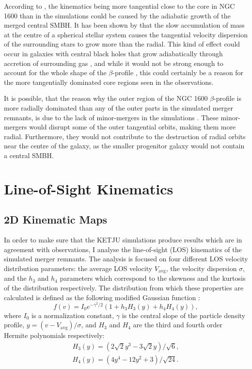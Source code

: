 \documentclass[english, oneside]{HYgradu}
\begin{document}
According to \cite{Rantala2018}, the kinematics being more tangential close to the core in NGC 1600 than in the simulations could be caused by the adiabatic growth of the merged central SMBH. It has been shown by \cite{GoodmanBinney1984} that the slow accumulation of mass at the centre of a spherical stellar system causes the tangential velocity dispersion of the surrounding stars to grow more than the radial. This kind of effect could occur in galaxies with central black holes that grow adiabatically through accretion of surrounding gas \citep{Young1980}, and while it would not be strong enough to account for the whole shape of the $\beta$-profile \citep{Thomas2014}, this could certainly be a reason for the more tangentially dominated core regions seen in the observations.

It is possible, that the reason why the outer region of the NGC 1600 $\beta$-profile is more radially dominated than any of the outer parts in the simulated merger remnants, is due to the lack of minor-mergers in the simulations \citep{Rantala2018}. These minor-mergers would disrupt some of the outer tangential orbits, making them more radial. Furthermore, they would not contribute to the destruction of radial orbits near the centre of the galaxy, as the smaller progenitor galaxy would not contain a central SMBH.

\section{Line-of-Sight Kinematics}

\subsection{2D Kinematic Maps}

In order to make sure that the KETJU simulations produce results which are in agreement with observations, I analyse the line-of-sight (LOS) kinematics of the simulated merger remnants. The analysis is focused on four different LOS velocity distribution parameters: the average LOS velocity $V_\mathrm{avg}$, the velocity dispersion $\sigma$, and the $h_3$ and $h_4$ parameters which correspond to the skewness and the kurtosis of the distribution respectively. The distribution from which these properties are calculated is defined as the following modified Gaussian function \citep{VanDerMarel1993, Bender1994}:
\begin{equation}
f(v) = I_0 e^{-\gamma^2/2}(1 + h_3 H_3(y) + h_4 H_4(y)), \label{eq:mod_gaussian}
\end{equation} 
where $I_0$ is a normalization constant, $\gamma$ is the central slope of the particle density profile, $y = (v - V_\mathrm{avg})/\sigma$, and $H_3$ and $H_4$ are the third and fourth order Hermite polynomials respectively:
\begin{eqnarray}
H_3(y) = \left(2\sqrt{2}y^3 - 3\sqrt{2}y\right) / \sqrt{6}, \\
H_4(y) = \left(4y^4 - 12y^2 + 3 \right) / \sqrt{24}.
\end{eqnarray}
\end{document}

